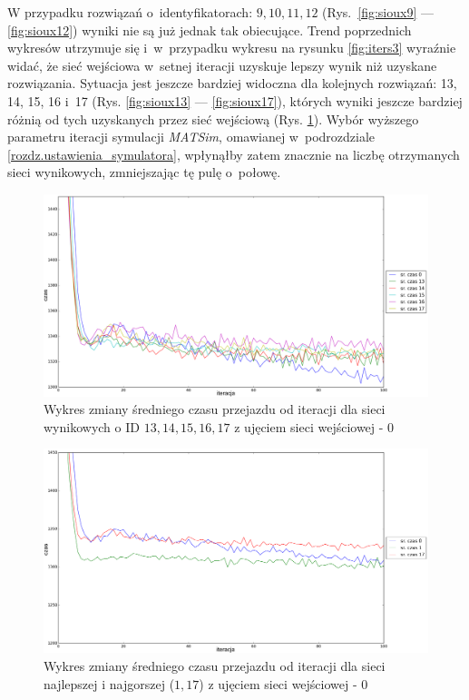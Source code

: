 \documentclass[twoside,12pt]{report}
\begin{document}
W przypadku rozwiązań o~identyfikatorach: $9, 10, 11, 12$ (Rys.~\ref{fig:sioux9} --- \ref{fig:sioux12}) wyniki nie są już jednak tak obiecujące. Trend poprzednich wykresów utrzymuje się i~w~przypadku wykresu na rysunku \ref{fig:iters3} wyraźnie widać, że sieć wejściowa w~setnej iteracji uzyskuje lepszy wynik niż uzyskane rozwiązania. Sytuacja jest jeszcze bardziej widoczna dla kolejnych rozwiązań: 13, 14, 15, 16 i~17 (Rys. \ref{fig:sioux13} --- \ref{fig:sioux17}), których wyniki jeszcze bardziej różnią od tych uzyskanych przez sieć wejściową (Rys. \ref{fig:iters4}). Wybór wyższego parametru iteracji symulacji \textit{MATSim}, omawianej w~podrozdziale \ref{rozdz.ustawienia_symulatora}, wpłynąłby zatem znacznie  na liczbę otrzymanych sieci wynikowych, zmniejszając tę pulę o~połowę.

\begin{figure}[htbp]
\centering
\includegraphics[width=1\textwidth]{img/iters/iters4}
\caption{Wykres zmiany średniego czasu przejazdu od iteracji dla sieci wynikowych o ID $13, 14, 15, 16, 17$ z ujęciem sieci wejściowej - $0$}
\label{fig:iters4}
\end{figure}

\begin{figure}[htbp]
\centering
\includegraphics[width=1\textwidth]{img/iters/iters5}
\caption{Wykres zmiany średniego czasu przejazdu od iteracji dla sieci najlepszej i najgorszej ($1, 17$) z ujęciem sieci wejściowej - 0}
\label{fig:iters5}
\end{figure}
\end{document}
